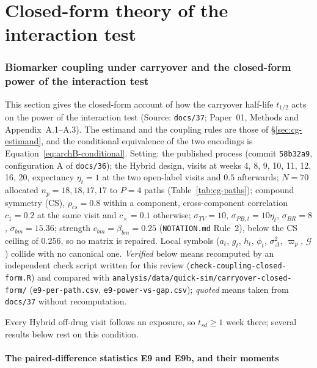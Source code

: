 \documentclass[11pt]{article}
\newcommand{\code}[1]{\texttt{#1}}
\begin{document}
\part{Closed-form theory of the interaction test}

\section{Biomarker coupling under carryover and the closed-form power
of the interaction test}
\label{sec:cg}

This section gives the closed-form account of how the carryover
half-life $t_{1/2}$ acts on the power of the interaction test (Source:
\code{docs/37}; Paper~01, Methods and Appendix~A.1--A.3). The estimand
and the coupling rules are those of \S\ref{sec:cg-estimand}, and the
conditional equivalence of the two encodings is
Equation~\eqref{eq:archB-conditional}. Setting: the
published process (commit \code{58b32a9}, configuration A of
\code{docs/36}); the Hybrid design, visits at weeks 4, 8, 9, 10, 11,
12, 16, 20, expectancy $\eta_t = 1$ at the two open-label visits and
$0.5$ afterwards; $N = 70$ allocated $n_p = 18, 18, 17, 17$ to $P = 4$
paths (Table~\ref{tab:cg-paths}); compound symmetry (CS), $\rho_{cs} = 0.8$
within a component, cross-component correlation $c_1 = 0.2$ at the
same visit and $c_\times = 0.1$ otherwise; $\sigma_{TV} = 10$,
$\sigma_{PB,t} = 10\eta_t$, $\sigma_{BR} = 8$, $\sigma_{bm} = 15.36$;
strength $c_{bm} = \beta_{bm} = 0.25$ (\code{NOTATION.md} Rule~2),
below the CS ceiling of $0.256$, so no matrix is repaired. Local
symbols ($a_t$, $g_t$, $h_t$, $\phi_t$, $\sigma_\Delta^2$, $\varpi_p$, $\mathcal G$)
collide with no canonical one. \emph{Verified} below means recomputed
by an independent check script written for this review
(\code{check-coupling-closed-form.R}) and compared with
\code{analysis/data/quick-sim/carryover-closed-form/}
(\code{e9-per-path.csv}, \code{e9-power-vs-gap.csv}); \emph{quoted}
means taken from \code{docs/37} without recomputation.

Every Hybrid off-drug visit follows an exposure, so $t_{sd} \ge 1$
week there; several results below rest on this condition.

\subsection{The paired-difference statistics E9 and E9b, and their
moments}
\label{sec:cg-moments}
\end{document}
